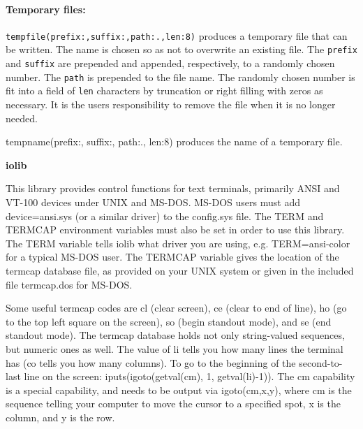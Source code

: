 \paragraph{Temporary files:}
\texttt{tempfile(prefix:{\textquotedbl}{\textquotedbl},suffix:{\textquotedbl}{\textquotedbl},path:{\textquotedbl}.{\textquotedbl},len:8)}
produces a temporary file that can be written. The name is chosen so as
not to overwrite an existing file. The \texttt{prefix} and
\texttt{suffix} are prepended and appended, respectively, to a randomly
chosen number. The \texttt{path} is prepended to the file name. The
randomly chosen number is fit into a field of \texttt{len} characters
by truncation or right filling with zeros as necessary. It is the
user{\textquotesingle}s responsibility to remove the file when it is no
longer needed.

\textsf{tempname(prefix:{\textquotedbl}{\textquotedbl},
suffix:{\textquotedbl}{\textquotedbl},
path:{\textquotedbl}.{\textquotedbl}, len:8)} produces the name of a
temporary file.

{\sffamily\bfseries
iolib}

This library provides control functions for text terminals, primarily
ANSI and VT-100 devices under UNIX and MS-DOS. MS-DOS users must add
{\textquotedbl}device=ansi.sys{\textquotedbl} (or a similar driver) to
the config.sys file. The TERM and TERMCAP environment variables must also be set in order to use
this library. The TERM variable tells iolib what driver you are using,
e.g. TERM=ansi-color for a typical MS-DOS user. The TERMCAP variable
gives the location of the termcap database file, as provided on your
UNIX system or given in the included file termcap.dos for MS-DOS.

Some useful termcap codes are {\textquotedbl}cl{\textquotedbl} (clear
screen), {\textquotedbl}ce{\textquotedbl} (clear to end of line),
{\textquotedbl}ho{\textquotedbl} (go to the top left square on the
screen), {\textquotedbl}so{\textquotedbl} (begin standout mode), and
{\textquotedbl}se{\textquotedbl} (end standout mode). The termcap
database holds not only string-valued sequences, but numeric ones as
well. The value of {\textquotedbl}li{\textquotedbl} tells you how many
lines the terminal has ({\textquotedbl}co{\textquotedbl} tells you how
many columns). To go to the beginning of the second-to-last line on the
screen: iputs(igoto(getval({\textquotedbl}cm{\textquotedbl}), 1,
getval({\textquotedbl}li{\textquotedbl})-1)). The
{\textquotedbl}cm{\textquotedbl} capability is a special capability,
and needs to be output via igoto(cm,x,y), where cm is the sequence
telling your computer to move the cursor to a specified spot, x is the
column, and y is the row.

